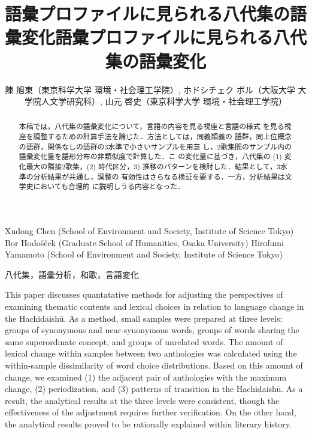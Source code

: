 \documentclass[submit]{ipsj}
\author{陳 旭東（東京科学大学 環境・社会理工学院）, ホドシチェク ボル（大阪大学 大学院人文学研究科）, 山元 啓史（東京科学大学 環境・社会理工学院）}
\date{}
\title{語彙プロファイルに見られる八代集の語彙変化}
\renewcommand{\author}[1]{}
\begin{document}
\title{語彙プロファイルに見られる八代集の語彙変化}


\author{陳 旭東（東京科学大学 環境・社会理工学院）}{Xudong Chen (School of Environment and Society, Institute of Science Tokyo)}{}
\author{ホドシチェク ボル（大阪大学 大学院人文学研究科）}{Bor Hodo\v{s}\v{c}ek (Graduate School of Humanities, Osaka University)}{}
\author{山元 啓史（東京科学大学 環境・社会理工学院）}{Hirofumi Yamamoto (School of Environment and Society, Institute of Science Tokyo)}{}

\begin{abstract}
  本稿では，八代集の語彙変化について，言語の内容を見る視座と言語の様式
  を見る視座を調整するための計算手法を論じた．方法としては，同義類義の
  語群，同上位概念の語群，関係なしの語群の3水準で小さいサンプルを用意
  し，2歌集間のサンプル内の語彙変化量を語形分布の非類似度で計算した．こ
  の変化量に基づき，八代集の (1) 変化最大の隣接2歌集，(2) 時代区分，3)
  推移のパターンを検討した．結果として，3水準の分析結果が共通し，調整の
  有効性はさらなる検証を要する．一方，分析結果は文学史においても合理的
  に説明しうる内容となった．
\end{abstract}

\begin{jkeyword}
  八代集，語彙分析，和歌，言語変化
\end{jkeyword}

\begin{eabstract}
  This paper discusses quantatative methods for adjusting the
  perspectives of examining thematic contents and lexical choices in
  relation to language change in the Hachidaishū. As a method, small
  samples were prepared at three levels: groups of synonymous and
  near-synonymous words, groups of words sharing the same
  superordinate concept, and groups of unrelated words. The amount of
  lexical change within samples between two anthologies was calculated
  using the within-sample dissimilarity of word choice
  distributions. Based on this amount of change, we examined (1) the
  adjacent pair of anthologies with the maximum change, (2)
  periodization, and (3) patterns of transition in the Hachidaishū. As
  a result, the analytical results at the three levels were
  consistent, though the effectiveness of the adjustment requires
  further verification. On the other hand, the analytical results
  proved to be rationally explained within literary history.
\end{eabstract}
\end{document}
